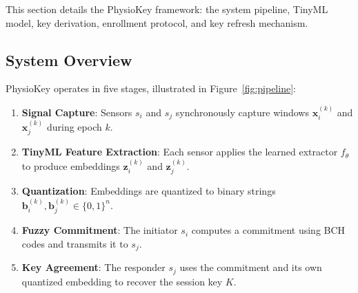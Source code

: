\documentclass[sensors,article,submit,pdftex,moreauthors]{Definitions/mdpi}
\begin{document}
This section details the PhysioKey framework: the system pipeline, TinyML model, key derivation, enrollment protocol, and key refresh mechanism.

\subsection{System Overview}
\label{subsec:overview}

PhysioKey operates in five stages, illustrated in Figure~\ref{fig:pipeline}:

\begin{enumerate}
    \item \textbf{Signal Capture}: Sensors $s_i$ and $s_j$ synchronously capture windows $\mathbf{x}_i^{(k)}$ and $\mathbf{x}_j^{(k)}$ during epoch $k$.
    \item \textbf{TinyML Feature Extraction}: Each sensor applies the learned extractor $f_\theta$ to produce embeddings $\mathbf{z}_i^{(k)}$ and $\mathbf{z}_j^{(k)}$.
    \item \textbf{Quantization}: Embeddings are quantized to binary strings $\mathbf{b}_i^{(k)}, \mathbf{b}_j^{(k)} \in \{0,1\}^n$.
    \item \textbf{Fuzzy Commitment}: The initiator $s_i$ computes a commitment using BCH codes and transmits it to $s_j$.
    \item \textbf{Key Agreement}: The responder $s_j$ uses the commitment and its own quantized embedding to recover the session key $K$.
\end{enumerate}
\end{document}
